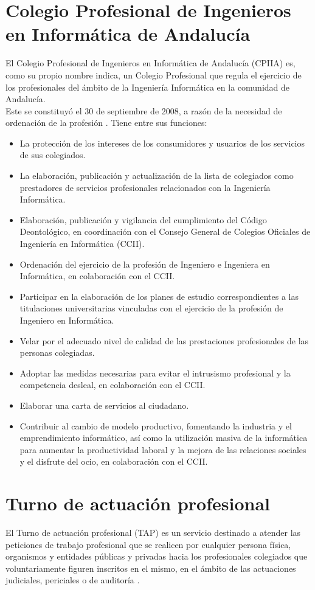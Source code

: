 \section{Colegio Profesional de Ingenieros en Informática de Andalucía}
El Colegio Profesional de Ingenieros en Informática de Andalucía (CPIIA) es, como su propio nombre indica, un Colegio Profesional que regula el ejercicio de los profesionales del ámbito de la Ingeniería Informática en la comunidad de Andalucía. \\

Este se constituyó el 30 de septiembre de 2008, a razón de la necesidad de ordenación de la profesión \cite{cpiia}. Tiene entre sus funciones:
\begin{itemize}
\item La protección de los intereses de los consumidores y usuarios de los servicios de sus colegiados.
\item La elaboración, publicación y actualización de la lista de colegiados como prestadores de servicios profesionales relacionados con la Ingeniería Informática.
\item Elaboración, publicación y vigilancia del cumplimiento del Código Deontológico, en coordinación con el Consejo General de Colegios Oficiales de Ingeniería en Informática (CCII).
\item Ordenación del ejercicio de la profesión de Ingeniero e Ingeniera en Informática, en colaboración con el CCII.
\item Participar en la elaboración de los planes de estudio correspondientes a las titulaciones universitarias vinculadas con el ejercicio de la profesión de Ingeniero en Informática.
\item Velar por el adecuado nivel de calidad de las prestaciones profesionales de las personas colegiadas.
\item Adoptar las medidas necesarias para evitar el intrusismo profesional y la competencia desleal, en colaboración con el CCII.
\item Elaborar una carta de servicios al ciudadano.
\item Contribuir al cambio de modelo productivo, fomentando la industria y el emprendimiento informático, así como la utilización masiva de la informática para aumentar la productividad laboral y la mejora de las relaciones sociales y el disfrute del ocio, en colaboración con el CCII.
\end{itemize}


\section{Turno de actuación profesional}
El Turno de actuación profesional (TAP) es un servicio destinado a atender las peticiones de trabajo profesional que se realicen por cualquier persona física, organismos y entidades públicas y privadas hacia los profesionales colegiados que voluntariamente figuren inscritos en el mismo, en el ámbito de las actuaciones judiciales, periciales o de auditoría \cite{tapecoourense}. \\


